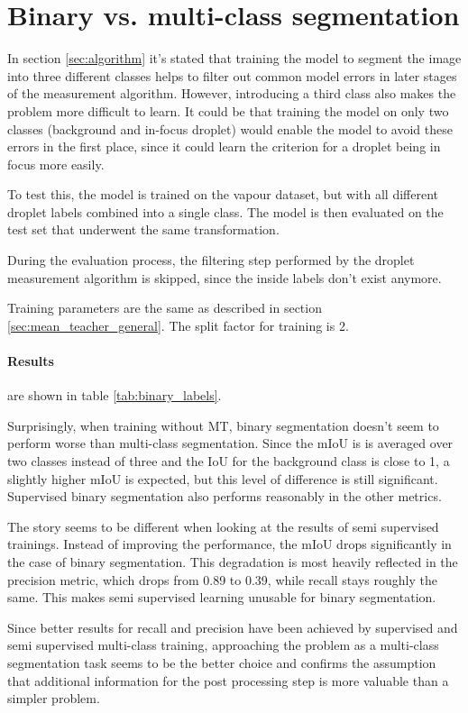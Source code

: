 \section{Binary vs. multi-class segmentation}
\label{sec:binary}

In section \ref{sec:algorithm} it's stated that training the model to segment the image into three different classes helps to filter out common model errors in later stages of the measurement algorithm. 
However, introducing a third class also makes the problem more difficult to learn. It could be that training the model on only two classes (background and in-focus droplet) would enable the model to avoid these errors in the first place, since it could learn the criterion for a droplet being in focus more easily.

To test this, the model is trained on the vapour dataset, but with all different droplet labels combined into a single class. The model is then evaluated on the test set that underwent the same transformation. 

During the evaluation process, the filtering step performed by the droplet measurement algorithm is skipped, since the inside labels don't exist anymore. 

Training parameters are the same as described in section \ref{sec:mean_teacher_general}. The split factor for training is 2.

\paragraph{Results} are shown in table \ref{tab:binary_labels}.

Surprisingly, when training without MT, binary segmentation doesn't seem to perform worse than multi-class segmentation.
Since the mIoU is is averaged over two classes instead of three and the IoU for the background class is close to 1, a slightly higher mIoU is expected, but this level of difference is still significant. 
Supervised binary segmentation also performs reasonably in the other metrics.

The story seems to be different when looking at the results of semi supervised trainings. 
Instead of improving the performance, the mIoU drops significantly in the case of binary segmentation.
This degradation is most heavily reflected in the precision metric, which drops from 0.89 to 0.39, while recall stays roughly the same.
This makes semi supervised learning unusable for binary segmentation.

Since better results for recall and precision have been achieved by supervised and semi supervised multi-class training, approaching the problem as a multi-class segmentation task seems to be the better choice and confirms the assumption that additional information for the post processing step is more valuable than a simpler problem.

